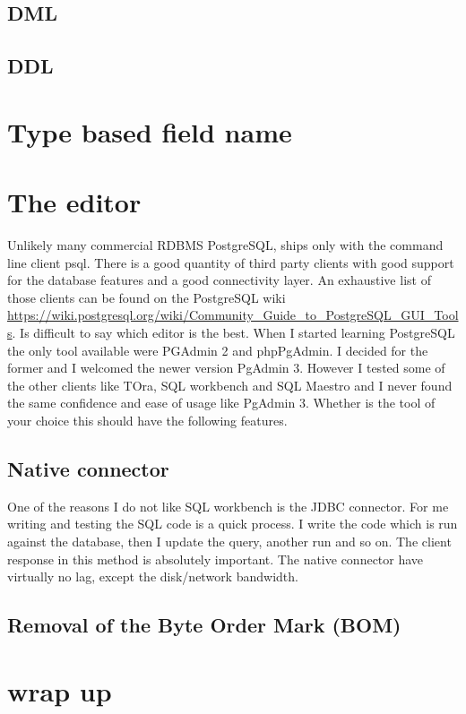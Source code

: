 \subsection{DML}

\subsection{DDL}

\section{Type based field name}


\section{The editor}
Unlikely many commercial RDBMS PostgreSQL, ships only with the command line client psql. There is a 
good quantity of third party clients with good support for the database features and a good connectivity 
layer. An exhaustive list of those clients can be found on the PostgreSQL wiki\newline
\href{https://wiki.postgresql.org/wiki/Community\_Guide\_to\_PostgreSQL\_GUI\_Tools}{
https://wiki.postgresql.org/wiki/Community\_Guide\_to\_PostgreSQL\_GUI\_Tools}. Is difficult to say 
which editor is the best. When I started learning PostgreSQL the only tool available were PGAdmin 2 and 
phpPgAdmin. I decided for the former and I welcomed the newer version PgAdmin 3. However I tested some of 
the other clients like TOra, SQL workbench and SQL Maestro and I never found the same confidence and ease 
of usage like PgAdmin 3. Whether is the tool of your choice this should have the following features.

\subsection{Native connector}
One of the reasons I do not like SQL workbench is the JDBC connector. For me writing and testing the SQL 
code is a quick process. I write the code which is run against the database, then I update the query, 
another run and so on. The client response in this method is absolutely important. The native connector 
have virtually no lag, except the disk/network bandwidth.

\subsection{Removal of the Byte Order Mark (BOM)} 


\section{wrap up}
